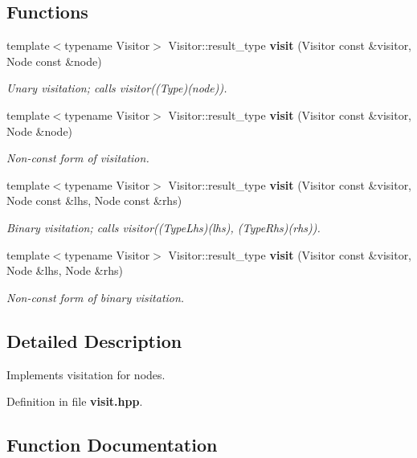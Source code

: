 \subsection*{Functions}
\begin{CompactItemize}
\item 
template$<$typename Visitor$>$ Visitor::result\_\-type {\bf visit} (Visitor const \&visitor, Node const \&node)
\begin{CompactList}\small\item\em Unary visitation; calls visitor((Type)(node)). \item\end{CompactList}\item 
template$<$typename Visitor$>$ Visitor::result\_\-type {\bf visit} (Visitor const \&visitor, Node \&node)\label{namespacesprite_a68}

\begin{CompactList}\small\item\em Non-const form of visitation. \item\end{CompactList}\item 
template$<$typename Visitor$>$ Visitor::result\_\-type {\bf visit} (Visitor const \&visitor, Node const \&lhs, Node const \&rhs)
\begin{CompactList}\small\item\em Binary visitation; calls visitor((Type\-Lhs)(lhs), (Type\-Rhs)(rhs)). \item\end{CompactList}\item 
template$<$typename Visitor$>$ Visitor::result\_\-type {\bf visit} (Visitor const \&visitor, Node \&lhs, Node \&rhs)\label{namespacesprite_a70}

\begin{CompactList}\small\item\em Non-const form of binary visitation. \item\end{CompactList}\end{CompactItemize}


\subsection{Detailed Description}
Implements visitation for nodes. 



Definition in file {\bf visit.hpp}.

\subsection{Function Documentation}
